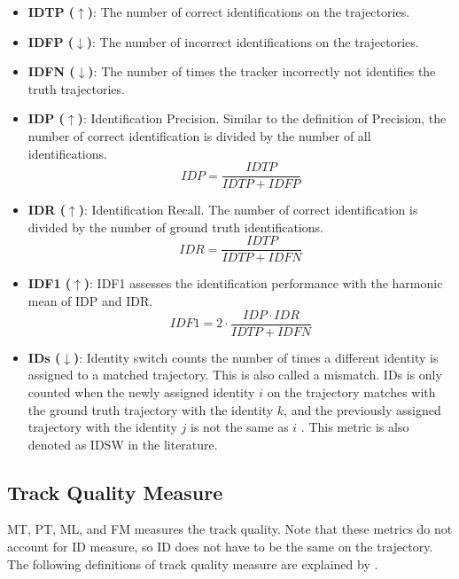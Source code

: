 \begin{itemize}

\item \textbf{IDTP ($\uparrow$)}: The number of correct identifications on the trajectories.

\item \textbf{IDFP ($\downarrow$)}: The number of incorrect identifications on the trajectories.

\item \textbf{IDFN ($\downarrow$)}: The number of times the tracker incorrectly not identifies the truth trajectories.

\item \textbf{IDP ($\uparrow$)}: Identification Precision. Similar to the definition of Precision, the number of correct identification is divided by the number of all identifications.
\begin{equation}
IDP = \frac{IDTP}{IDTP + IDFP}
\label{eqn:IDP}
\end{equation}

\item \textbf{IDR ($\uparrow$)}: Identification Recall. The number of correct identification is divided by the number of ground truth identifications.
\begin{equation}
IDR = \frac{IDTP}{IDTP + IDFN}
\label{eqn:IDR}
\end{equation}

\item \textbf{IDF1 ($\uparrow$)}: IDF1 assesses the identification performance with the harmonic mean of IDP and IDR. 
\begin{equation}
IDF1 = 2 \cdot \frac{IDP \cdot IDR}{IDTP + IDFN}
\label{eqn:IDF1}
\end{equation}

\item \textbf{IDs ($\downarrow$)}: Identity switch counts the number of times a different identity is assigned to a matched trajectory. This is also called a mismatch. IDs is only counted when the newly assigned identity $\textit{i}$ on the trajectory matches with the ground truth trajectory with the identity $\textit{k}$, and the previously assigned trajectory with the identity $\textit{j}$ is not the same as $\textit{i}$ \cite{milan_mot16_2016}. This metric is also denoted as IDSW in the literature.
\end{itemize}



\subsection{Track Quality Measure}
MT, PT, ML, and FM measures the track quality. Note that these metrics do not account for ID measure, so ID does not have to be the same on the trajectory. The following definitions of track quality measure are explained by \cite{milan_mot16_2016}.

